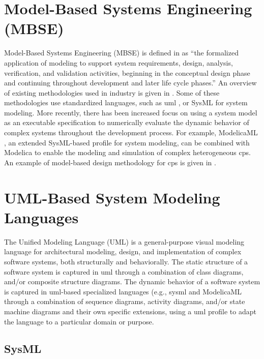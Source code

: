 \section{Model-Based Systems Engineering (MBSE)}
\label{sec:mbse}

Model-Based Systems Engineering (MBSE) is defined in \cite{mbsdincose} as “the formalized application of modeling to support system requirements, design, analysis, verification, and validation activities, beginning in the conceptual design phase and continuing throughout development and later life cycle phases.” An overview of existing methodologies used in industry is given in \cite{mbsdestefan}. Some of these methodologies use standardized languages, such as \acrshort{uml} \cite{uml}, or SysML \cite{sysml} for system modeling. 
More recently, there has been increased focus on using a system model as an executable specification to numerically evaluate the dynamic behavior of complex systems throughout the development process. For example, ModelicaML \cite{modelicaml, modelicamlreport}, an extended SysML-based profile for system modeling, can be combined with Modelica to enable the modeling and simulation of complex heterogeneous \acrshort{cps}. An example of model-based design methodology for \acrshort{cps} is given in \cite{mbsdjensen}.


\section{UML-Based System Modeling Languages}
\label{sec:uml}
 
The Unified Modeling Language (UML) \cite{uml} is a general-purpose visual modeling language for architectural modeling, design, and implementation of complex software systems, both structurally and behaviorally. The static structure of a software system is captured in \acrshort{uml} through a combination of class diagrams, and/or composite structure diagrams. The dynamic behavior of a software system is captured in \acrshort{uml}-based specialized languages (e.g., \acrshort{sysml}\cite{sysml,sysmlmorgan} and ModelicaML\cite{modelicaml, modelicamlreport} through a combination of sequence diagrams, activity diagrams, and/or state machine diagrams and their own specific extensions, using a \acrshort{uml} profile to adapt the language to a particular domain or purpose. 

\subsection{SysML}
\label{sec:sysml}


